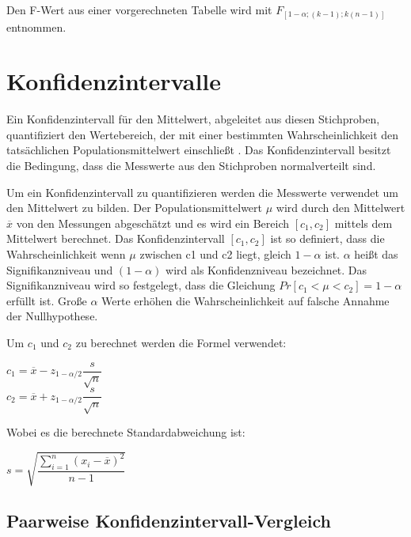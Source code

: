 Den F-Wert aus einer vorgerechneten Tabelle wird mit $F_{[1-\alpha;(k-1);k(n-1)]}$ entnommen.

\section{Konfidenzintervalle}

Ein Konfidenzintervall für den Mittelwert, abgeleitet aus diesen Stichproben, quantifiziert den Wertebereich, 
der mit einer bestimmten Wahrscheinlichkeit den tatsächlichen Populationsmittelwert einschließt \cite{statistically_rigorous}.
Das Konfidenzintervall besitzt die Bedingung, dass die Messwerte aus den Stichproben normalverteilt sind.

Um ein Konfidenzintervall zu quantifizieren werden die Messwerte verwendet um den Mittelwert zu bilden.
Der Populationsmittelwert $\mu$ wird durch den Mittelwert $\overline{x}$ von den Messungen abgeschätzt
und es wird ein Bereich $[c_1,c_2]$ mittels dem Mittelwert berechnet.
Das Konfidenzintervall $[c_1, c_2]$ ist so definiert, dass die Wahrscheinlichkeit
wenn $\mu$ zwischen c1 und c2 liegt, gleich $1 - \alpha$ ist. $\alpha$ heißt das
Signifikanzniveau und $(1 - \alpha)$ wird als Konfidenzniveau bezeichnet.
Das Signifikanzniveau wird so festgelegt, dass die Gleichung $Pr[c_1 < \mu < c_2] = 1 -\alpha$ erfüllt ist. 
Große $\alpha$ Werte erhöhen die Wahrscheinlichkeit auf falsche Annahme der Nullhypothese. 

Um $c_1$ und $c_2$ zu berechnet werden die Formel verwendet:

\begin{center}
         $c_1 = \overline{x} - z_{1-\alpha/2} \dfrac{s}{\sqrt{n}}$ \\
         $c_2 = \overline{x} + z_{1-\alpha/2} \dfrac{s}{\sqrt{n}}$ 

\end{center}

Wobei es die berechnete Standardabweichung ist:

\begin{center}
         $s = \sqrt{\dfrac{\sum_{i=1}^{n} (x_i - \overline{x})^2}{n-1}}$ 
\end{center}

\subsection{Paarweise Konfidenzintervall-Vergleich}

